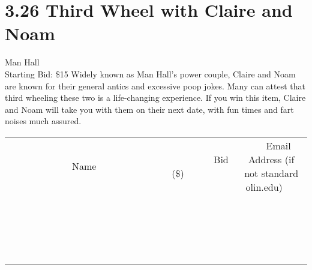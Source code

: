 \documentclass[11pt]{article}
\begin{document}
\section*{3.26 Third Wheel with Claire and Noam}
Man Hall
\\
Starting Bid: \$15
\newline
Widely known as Man Hall's power couple, Claire and Noam are known for their general antics and excessive poop jokes. Many can attest that third wheeling these two is a life-changing experience. If you win this item, Claire and Noam will take you with them on their next date, with fun times and fart noises much assured.
\\[3ex]
\begin{tabular}{c c c}
~~~~~~~~~~~~~Name~~~~~~~~~~~~~ & ~~~~~~~~~Bid (\$)~~~~~~~~~  & ~~~Email Address (if not standard olin.edu)~~~\\
 & & \\
\hline
 & & \\
\hline
 & & \\
\hline
 & & \\
\hline
 & & \\
\hline
 & & \\
\hline
 & & \\
\hline
 & & \\
\hline
 & & \\
\hline
 & & \\
\hline
 & & \\
\hline
 & & \\
\hline
 & & \\
\hline
 & & \\
\hline
 & & \\
\hline
 & & \\
\hline
 & & \\
\hline
 & & \\
\hline
 & & \\
\hline
\end{tabular}
\newpage
\end{document}
